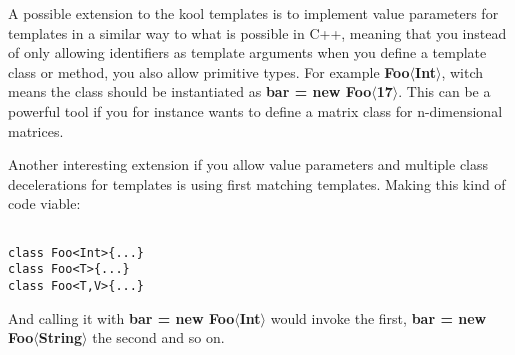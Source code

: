 A possible extension to the kool templates is to implement value parameters for
templates in a similar way to what is possible in C++, meaning that you instead
of only allowing identifiers as template arguments when you define a template
class or method, you also allow primitive types. For example
\textbf{Foo$\langle$Int$\rangle$}, witch means the class should be instantiated
as \textbf{bar = new Foo$\langle$17$\rangle$}. This can be a powerful tool if
you for instance wants to define a matrix class for n-dimensional matrices.

Another interesting extension if you allow value parameters and multiple
class decelerations for templates is using first matching templates. Making
this kind of code viable:

\begin{lstlisting}

class Foo<Int>{...}
class Foo<T>{...}
class Foo<T,V>{...}

\end{lstlisting}

And calling it with \textbf{bar = new Foo$\langle$Int$\rangle$} would invoke
the first, \textbf{bar = new Foo$\langle$String$\rangle$} the second and so on.
